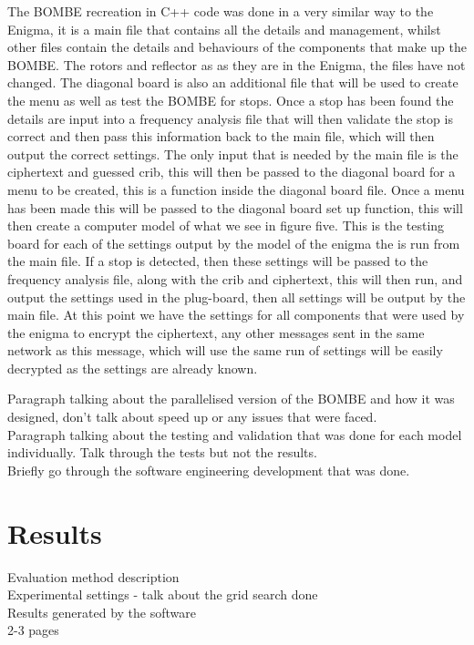\documentclass[12pt,a4paper]{article}
\begin{document}
The BOMBE recreation in C++ code was done in a very similar way to the Enigma, it is a main file that contains all the details and management, whilst other files contain the details and behaviours of the components that make up the BOMBE. The rotors and reflector as as they are in the Enigma, the files have not changed. The diagonal board is also an additional file that will be used to create the menu as well as test the BOMBE for stops. Once a stop has been found the details are input into a frequency analysis file that will then validate the stop is correct and then pass this information back to the main file, which will then output the correct settings. The only input that is needed by the main file is the ciphertext and guessed crib, this will then be passed to the diagonal board for a menu to be created, this is a function inside the diagonal board file. Once a menu has been made this will be passed to the diagonal board set up function, this will then create a computer model of what we see in figure five. This is the testing board for each of the settings output by the model of the enigma the is run from the main file. If a stop is detected, then these settings will be passed to the frequency analysis file, along with the crib and ciphertext, this will then run, and output the settings used in the plug-board, then all settings will be output by the main file. At this point we have the settings for all components that were used by the enigma to encrypt the ciphertext, any other messages sent in the same network as this message, which will use the same run of settings will be easily decrypted as the settings are already known.

Paragraph talking about the parallelised version of the BOMBE and how it was designed, don't talk about speed up or any issues that were faced.\\

Paragraph talking about the testing and validation that was done for each model individually. Talk through the tests but not the results.\\

Briefly go through the software engineering development that was done.

\section{Results}

Evaluation method description\\
Experimental settings - talk about the grid search done\\
Results generated by the software\\
2-3 pages
\end{document}
